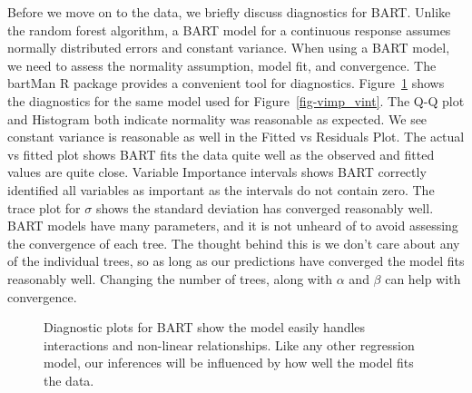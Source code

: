\documentclass[
  12pt,
  letterpaper,
  DIV=11,
  numbers=noendperiod]{scrartcl}
\begin{document}
Before we move on to the data, we briefly discuss diagnostics for BART.
Unlike the random forest algorithm, a BART model for a continuous
response assumes normally distributed errors and constant variance. When
using a BART model, we need to assess the normality assumption, model
fit, and convergence. The bartMan R package \citep{bartMan} provides a
convenient tool for diagnostics. Figure~\ref{fig-bart_diag} shows the
diagnostics for the same model used for Figure~\ref{fig-vimp_vint}. The
Q-Q plot and Histogram both indicate normality was reasonable as
expected. We see constant variance is reasonable as well in the Fitted
vs Residuals Plot. The actual vs fitted plot shows BART fits the data
quite well as the observed and fitted values are quite close. Variable
Importance intervals shows BART correctly identified all variables as
important as the intervals do not contain zero. The trace plot for
\(\sigma\) shows the standard deviation has converged reasonably well.
BART models have many parameters, and it is not unheard of to avoid
assessing the convergence of each tree. The thought behind this is we
don't care about any of the individual trees, so as long as our
predictions have converged the model fits reasonably well. Changing the
number of trees, along with \(\alpha\) and \(\beta\) can help with
convergence.

\begin{figure}[H]


\caption{\label{fig-bart_diag}Diagnostic plots for BART show the model
easily handles interactions and non-linear relationships. Like any other
regression model, our inferences will be influenced by how well the
model fits the data.}

\end{figure}%
\end{document}

